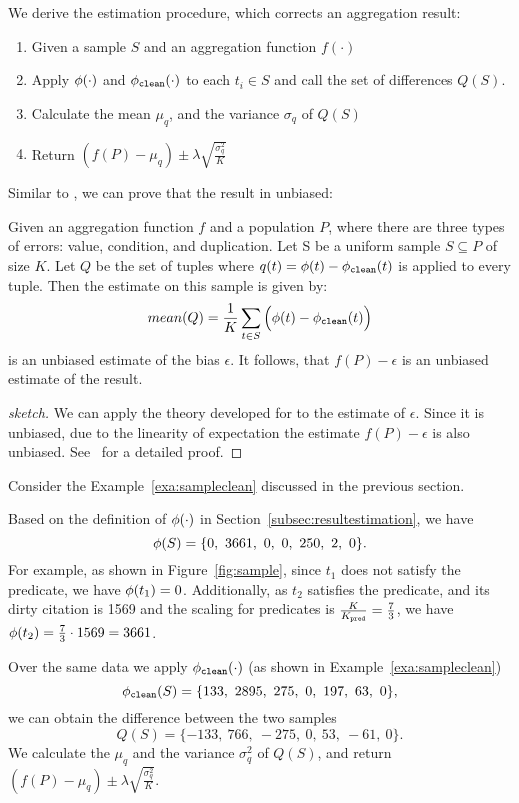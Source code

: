 \vspace{.5em}{\noindent \bf \bias Estimation}
We derive the \bias estimation procedure, which corrects an aggregation result:
\begin{enumerate}
\item Given a sample $S$ and an aggregation function $f(\cdot)$
\item Apply $\phi (\cdot)$ and $\phi_{\texttt{clean} } (\cdot)$ to each $t_i \in S$ and call the set of differences  $Q(S)$.
\item Calculate the mean $\mu_q$, and the variance $\sigma_q$ of $Q(S)$
\item Return $(f(P) - \mu_q) \pm \lambda \sqrt{\frac{\sigma_q^2}{K}}$
\end{enumerate}

Similar to \sampleclean, we can prove that the result in unbiased:
\begin{theorem}\label{thm:bias}
Given an aggregation function $f$ and a population $P$,
where there are three types of errors: value, condition, and duplication.
Let S be a uniform sample $S \subseteq P$ of size $K$.
Let $Q$ be the set of tuples where $q(t)=\phi (t)-\phi_{\texttt{clean} } (t)$ is applied to every tuple.
Then the estimate on this sample is given by:
\[ mean(Q) = \frac{1}{K}\sum_{t\in S} \Big (\phi (t)-\phi_{\texttt{clean} } (t) \Big)\]
is an unbiased estimate of the bias $\epsilon$.
It follows, that $f(P)-\epsilon$ is an unbiased estimate of the result.
\end{theorem}
\begin{proof}[sketch] We can apply the theory developed for \sampleclean to the estimate of $\epsilon$.
Since it is unbiased, due to the linearity of expectation the estimate $f(P)-\epsilon$ is also unbiased.
See~\cite{saqpfull} for a detailed proof.
\end{proof}

Consider the Example~\ref{exa:sampleclean} discussed in the previous section.
\begin{example}
Based on the definition of $\phi (\cdot)$ in Section~\ref{subsec:resultestimation}, we have 
\[\saqpfunc(S) = \{0,\ 3661,\ 0,\ 0,\ 250,\ 2,\ 0\}. \]
For example, as shown in Figure~\ref{fig:sample}, since $t_1$ does not satisfy the predicate, we have $\phi (t_1) = 0$.
Additionally, as $t_2$ satisfies the predicate, and its dirty citation is 1569 and the scaling for predicates is 
$\frac{K}{K_{\texttt{pred} }}=\frac{7}{3}$, we have $\phi (t_2) = \frac{7}{3}\cdot 1569 = 3661$. 

Over the same data we apply $\phi_{\texttt{clean} } (\cdot)$ (as shown in Example~\ref{exa:sampleclean})  
\[\saqpplusfunc(S) = \{133,\ 2895,\ 275,\ 0,\ 197,\ 63,\ 0\}, \]
we can obtain the difference between the two samples
\[Q(S) = \{-133,\ 766,\ -275,\ 0,\ 53,\ -61,\ 0\}.\]
We calculate the \mean $\mu_q$ and the variance $\sigma_q^2$ of $Q(S)$, and return $(f(P) - \mu_q) \pm \lambda \sqrt{\frac{\sigma_q^2}{K}}$.
\end{example}

